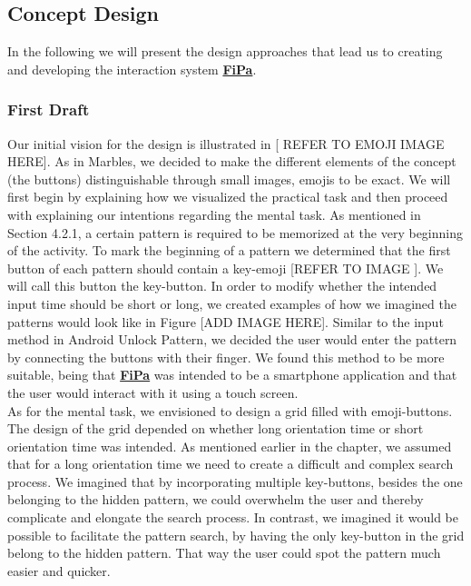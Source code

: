 \subsection{Concept Design} \label{4.2.2}
In the following we will present the design approaches that lead us to creating and developing the interaction system \underline{\textbf{FiPa}}.

\subsubsection{First Draft} \label{4.2.2.1}
Our initial vision for the design is illustrated in [ REFER TO EMOJI IMAGE HERE]. As in Marbles, we decided to make the different elements of the concept (the buttons) distinguishable through small images, emojis to be exact. We will first begin by explaining how we visualized the practical task and then proceed with explaining our intentions regarding the mental task. As mentioned in Section 4.2.1, a certain pattern is required to be memorized at the very beginning of the activity. To mark the beginning of a pattern we determined that the first button of each pattern should contain a key-emoji [REFER TO IMAGE ]. We will call this button the key-button. In order to modify whether the intended input time should be short or long, we created examples of how we imagined the patterns would look like in Figure [ADD IMAGE HERE]. Similar to the input method in Android Unlock Pattern, we decided the user would enter the pattern by connecting the buttons with their finger. We found this method to be more suitable, being that  \underline{\textbf{FiPa}} was intended to be a smartphone application and that the user would interact with it using a touch screen. \\

As for the mental task, we envisioned to design a grid filled with emoji-buttons. The design of the grid depended on whether long orientation time or short orientation time was intended. As mentioned earlier in the chapter, we assumed that for a long orientation time we need to create a difficult and complex search process. We imagined that by incorporating multiple key-buttons, besides the one belonging to the hidden pattern, we could overwhelm the user and thereby complicate and elongate the search process. In contrast, we imagined it would be possible to facilitate the pattern search, by having the only key-button in the grid belong to the hidden pattern. That way the user could spot the pattern much easier and quicker.

